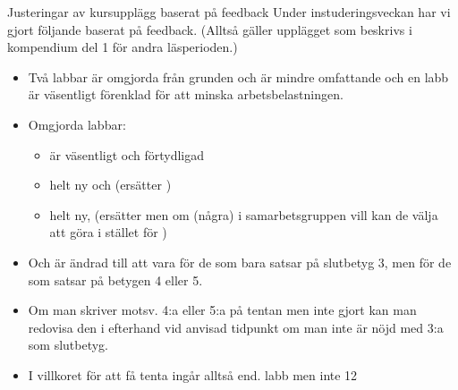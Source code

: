 

\ifkompendium\else


\begin{Slide}{Justeringar av kursupplägg baserat på feedback}\SlideFontSmall
  Under instuderingsveckan har vi gjort följande  baserat på feedback. (Alltså gäller  upplägget som beskrivs i kompendium del 1 för andra läsperioden.)
  \begin{itemize}
    \item Två labbar är omgjorda från grunden och är mindre omfattande och en labb är väsentligt förenklad för att minska arbetsbelastningen.
    \item Omgjorda labbar:
    \begin{itemize}\SlideFontSmall
      \item {} är väsentligt  och förtydligad
      \item {} helt ny och  (ersätter )
      \item {} helt ny,  (ersätter  men om (några) i samarbetsgruppen vill kan de välja att göra  i stället för )
    \end{itemize}
    \item Och  är ändrad till att vara  för de som bara satsar på slutbetyg 3, men  för de som satsar på betygen 4 eller 5.
    \item Om man skriver motsv. 4:a eller 5:a på tentan men inte gjort  kan man redovisa den i efterhand vid anvisad tidpunkt om man inte är nöjd med 3:a som slutbetyg.
    \item I villkoret för att få tenta ingår alltså end. labb  men inte 12
  \end{itemize}
\end{Slide}


